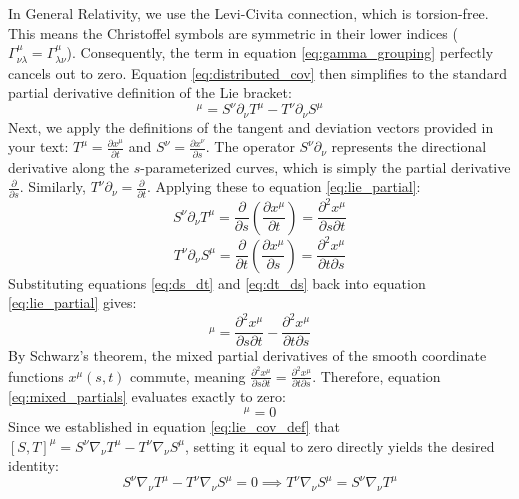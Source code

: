 \documentclass[11pt, a4paper]{report}
\begin{document}
In General Relativity, we use the Levi-Civita connection, which is torsion-free. This means the Christoffel symbols are symmetric in their lower indices ($\Gamma^\mu_{\nu\lambda} = \Gamma^\mu_{\lambda\nu}$). Consequently, the term in equation \eqref{eq:gamma_grouping} perfectly cancels out to zero. Equation \eqref{eq:distributed_cov} then simplifies to the standard partial derivative definition of the Lie bracket:
\begin{equation} [S,T]^\mu = S^\nu \partial_\nu T^\mu - T^\nu \partial_\nu S^\mu \label{eq:lie_partial} \end{equation}
Next, we apply the definitions of the tangent and deviation vectors provided in your text: $T^\mu = \frac{\partial x^\mu}{\partial t}$ and $S^\nu = \frac{\partial x^\nu}{\partial s}$. The operator $S^\nu \partial_\nu$ represents the directional derivative along the $s$-parameterized curves, which is simply the partial derivative $\frac{\partial}{\partial s}$. Similarly, $T^\nu \partial_\nu = \frac{\partial}{\partial t}$. Applying these to equation \eqref{eq:lie_partial}:
\begin{equation} S^\nu \partial_\nu T^\mu = \frac{\partial}{\partial s} \left( \frac{\partial x^\mu}{\partial t} \right) = \frac{\partial^2 x^\mu}{\partial s \partial t} \label{eq:ds_dt} \end{equation}
\begin{equation} T^\nu \partial_\nu S^\mu = \frac{\partial}{\partial t} \left( \frac{\partial x^\mu}{\partial s} \right) = \frac{\partial^2 x^\mu}{\partial t \partial s} \label{eq:dt_ds} \end{equation}
Substituting equations \eqref{eq:ds_dt} and \eqref{eq:dt_ds} back into equation \eqref{eq:lie_partial} gives:
\begin{equation} [S,T]^\mu = \frac{\partial^2 x^\mu}{\partial s \partial t} - \frac{\partial^2 x^\mu}{\partial t \partial s} \label{eq:mixed_partials} \end{equation}
By Schwarz's theorem, the mixed partial derivatives of the smooth coordinate functions $x^\mu(s, t)$ commute, meaning $\frac{\partial^2 x^\mu}{\partial s \partial t} = \frac{\partial^2 x^\mu}{\partial t \partial s}$. Therefore, equation \eqref{eq:mixed_partials} evaluates exactly to zero:
\begin{equation} [S,T]^\mu = 0 \label{eq:lie_zero} \end{equation}
Since we established in equation \eqref{eq:lie_cov_def} that $[S,T]^\mu = S^\nu \nabla_\nu T^\mu - T^\nu \nabla_\nu S^\mu$, setting it equal to zero directly yields the desired identity:
\begin{equation} S^\nu \nabla_\nu T^\mu - T^\nu \nabla_\nu S^\mu = 0 \implies T^\nu \nabla_\nu S^\mu = S^\nu \nabla_\nu T^\mu \label{eq:final_commutator_proof} \end{equation}
\end{document}
